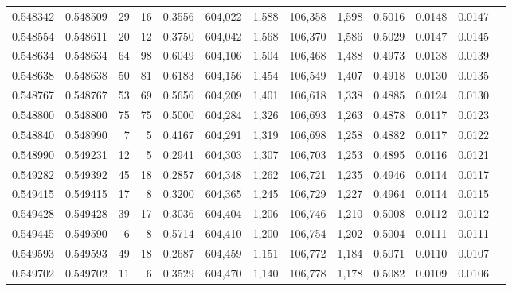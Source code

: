 \begin{tabular}{rrrrrrrrrrrrr}
0.548342 & 0.548509 &    29 &    16 &                                     0.3556 & 604,022 &   1,588 & 106,358 &   1,598 & 0.5016 & 0.0148 & 0.0147 \\
0.548554 & 0.548611 &    20 &    12 &                                     0.3750 & 604,042 &   1,568 & 106,370 &   1,586 & 0.5029 & 0.0147 & 0.0145 \\
0.548634 & 0.548634 &    64 &    98 &                                     0.6049 & 604,106 &   1,504 & 106,468 &   1,488 & 0.4973 & 0.0138 & 0.0139 \\
0.548638 & 0.548638 &    50 &    81 &                                     0.6183 & 604,156 &   1,454 & 106,549 &   1,407 & 0.4918 & 0.0130 & 0.0135 \\
0.548767 & 0.548767 &    53 &    69 &                                     0.5656 & 604,209 &   1,401 & 106,618 &   1,338 & 0.4885 & 0.0124 & 0.0130 \\
0.548800 & 0.548800 &    75 &    75 &                                     0.5000 & 604,284 &   1,326 & 106,693 &   1,263 & 0.4878 & 0.0117 & 0.0123 \\
0.548840 & 0.548990 &     7 &     5 &                                     0.4167 & 604,291 &   1,319 & 106,698 &   1,258 & 0.4882 & 0.0117 & 0.0122 \\
0.548990 & 0.549231 &    12 &     5 &                                     0.2941 & 604,303 &   1,307 & 106,703 &   1,253 & 0.4895 & 0.0116 & 0.0121 \\
0.549282 & 0.549392 &    45 &    18 &                                     0.2857 & 604,348 &   1,262 & 106,721 &   1,235 & 0.4946 & 0.0114 & 0.0117 \\
0.549415 & 0.549415 &    17 &     8 &                                     0.3200 & 604,365 &   1,245 & 106,729 &   1,227 & 0.4964 & 0.0114 & 0.0115 \\
0.549428 & 0.549428 &    39 &    17 &                                     0.3036 & 604,404 &   1,206 & 106,746 &   1,210 & 0.5008 & 0.0112 & 0.0112 \\
0.549445 & 0.549590 &     6 &     8 &                                     0.5714 & 604,410 &   1,200 & 106,754 &   1,202 & 0.5004 & 0.0111 & 0.0111 \\
0.549593 & 0.549593 &    49 &    18 &                                     0.2687 & 604,459 &   1,151 & 106,772 &   1,184 & 0.5071 & 0.0110 & 0.0107 \\
0.549702 & 0.549702 &    11 &     6 &                                     0.3529 & 604,470 &   1,140 & 106,778 &   1,178 & 0.5082 & 0.0109 & 0.0106 \\

\end{tabular}
